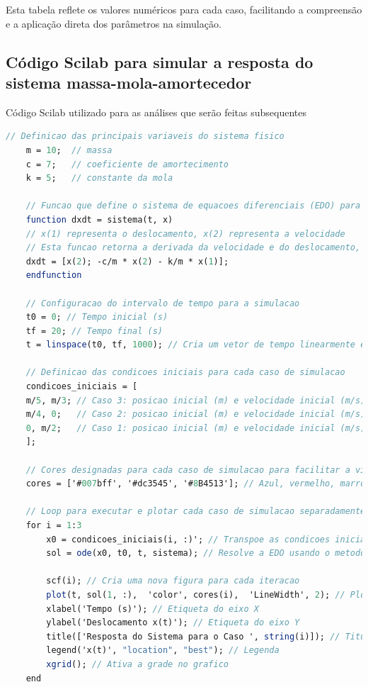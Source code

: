 Esta tabela reflete os valores numéricos para cada caso, facilitando a compreensão e a aplicação direta dos parâmetros na simulação.

\subsection{Código Scilab para simular a resposta do sistema massa-mola-amortecedor}
Código Scilab utilizado para as análises que serão feitas subsequentes
\begin{lstlisting}[language=Scilab, caption=Código Scilab para simular a resposta do sistema massa-mola-amortecedor]
    // Definicao das principais variaveis do sistema fisico
    m = 10;  // massa
    c = 7;   // coeficiente de amortecimento
    k = 5;   // constante da mola

    // Funcao que define o sistema de equacoes diferenciais (EDO) para o modelo massa-mola-amortecedor
    function dxdt = sistema(t, x)
    // x(1) representa o deslocamento, x(2) representa a velocidade
    // Esta funcao retorna a derivada da velocidade e do deslocamento, respectivamente
    dxdt = [x(2); -c/m * x(2) - k/m * x(1)];
    endfunction

    // Configuracao do intervalo de tempo para a simulacao
    t0 = 0; // Tempo inicial (s)
    tf = 20; // Tempo final (s)
    t = linspace(t0, tf, 1000); // Cria um vetor de tempo linearmente espacado para a simulacao

    // Definicao das condicoes iniciais para cada caso de simulacao
    condicoes_iniciais = [
    m/5, m/3; // Caso 3: posicao inicial (m) e velocidade inicial (m/s)
    m/4, 0;   // Caso 2: posicao inicial (m) e velocidade inicial (m/s)
    0, m/2;   // Caso 1: posicao inicial (m) e velocidade inicial (m/s)
    ];

    // Cores designadas para cada caso de simulacao para facilitar a visualizacao
    cores = ['#007bff', '#dc3545', '#8B4513']; // Azul, vermelho, marrom

    // Loop para executar e plotar cada caso de simulacao separadamente
    for i = 1:3
        x0 = condicoes_iniciais(i, :)'; // Transpoe as condicoes iniciais para a formatacao correta
        sol = ode(x0, t0, t, sistema); // Resolve a EDO usando o metodo de ODE

        scf(i); // Cria uma nova figura para cada iteracao
        plot(t, sol(1, :),  'color', cores(i),  'LineWidth', 2); // Plot do deslocamento x(t)
        xlabel('Tempo (s)'); // Etiqueta do eixo X
        ylabel('Deslocamento x(t)'); // Etiqueta do eixo Y
        title(['Resposta do Sistema para o Caso ', string(i)]); // Titulo do grafico
        legend('x(t)', "location", "best"); // Legenda
        xgrid(); // Ativa a grade no grafico
    end


\end{lstlisting}
